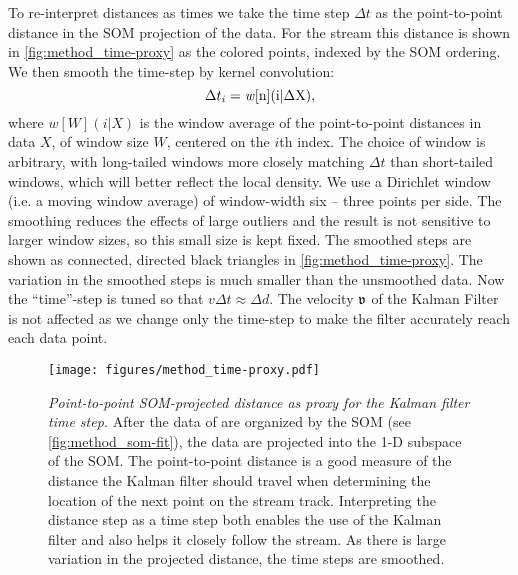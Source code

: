 \documentclass[fleqn,usenatbib]{mnras}
\begin{document}
    To re-interpret distances as times we take the time step $\Delta t$ as the
    point-to-point distance in the SOM projection of the data. For the
     stream this distance is shown in
    \autoref{fig:method_time-proxy} as the colored points, indexed by the SOM
    ordering. We then smooth the time-step by kernel convolution:
    \begin{equation}
      \Delta{t}_{i} = \rm{\mathit{w}[n](i|\Delta X)},
    \end{equation}
    where $\mathit{w}[W](i|X)$ is the window average of the point-to-point
    distances in data $X$, of window size $W$, centered on the $i$th index. The
    choice of window is arbitrary, with long-tailed windows more closely
    matching $\Delta{t}$ than short-tailed windows, which will better reflect
    the local density. We use a Dirichlet window (i.e. a moving window average)
    of window-width six -- three points per side. The smoothing reduces the
    effects of large outliers and the result is not sensitive to larger window
    sizes, so this small size is kept fixed. The smoothed steps are shown as
    connected, directed black triangles in \autoref{fig:method_time-proxy}. The
    variation in the smoothed steps is much smaller than the unsmoothed data.
    Now the ``time''-step is tuned so that $v \Delta{t} \approx \Delta{d}$. The
    velocity $\mathfrak{v}$ of the Kalman Filter is not affected as we change only
    the time-step to make the filter accurately reach each data point.

    \begin{figure}
      \centering
      \texttt{[image: figures/method\_time-proxy.pdf]}
      \caption{\emph{Point-to-point SOM-projected distance as proxy for the
      Kalman filter time step.} After the data of  are
      organized by the SOM (see \autoref{fig:method_som-fit}), the data are
      projected into the 1-D subspace of the SOM. The point-to-point distance is
      a good measure of the distance the Kalman filter should travel when
      determining the location of the next point on the stream track.
      Interpreting the distance step as a time step both enables the use of the
      Kalman filter and also helps it closely follow the stream. As there is
      large variation in the projected distance, the time steps are smoothed.}
      \label{fig:method_time-proxy}
    \end{figure}

\end{document}
